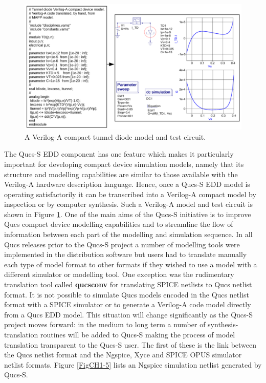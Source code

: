 \documentclass[10pt, a4paper]{report}
\begin{document}
\begin{figure}[h]
	\centering
	\includegraphics*[width=13cm]{pics/chap1/Qucs-S-CH1-Fig4.pdf}
	\caption{A Verilog-A compact tunnel diode model and test circuit. }
	\label{FigCH1-4}
\end{figure}
\noindent The Qucs-S EDD component has one feature which makes it particularly important for developing compact device simulation  models, namely that its structure and modelling capabilities are similar to those available with the Verilog-A hardware description language.  Hence, once a Qucs-S EDD model is operating satisfactorily it can be transcribed into a Verilog-A compact model by inspection or by computer synthesis.  Such a Verilog-A model and test circuit is shown in Figure \ref{FigCH1-4}.
One of the main aims of the Qucs-S initiative is to improve Qucs compact device modelling capabilities and to streamline the flow of information between each part of the modelling and simulation sequence. In all Qucs releases prior to the Qucs-S project a number of modelling tools were implemented in the distribution software but users had to translate manually each type of model format to other formats if they wished to use a model with a different simulator or modelling tool. One exception was the rudimentary translation tool called \textbf{qucsconv} for translating SPICE netlists to Qucs netlist format. It is not possible to simulate Qucs models encoded in the Qucs netlist format with a SPICE simulator or to generate a Verilog-A code model directly from a Qucs EDD model. This situation will change significantly as the Qucs-S project moves forward: in the medium to long term a number of synthesis-translation routines will be added to Qucs-S making the process of model translation transparent to the Qucs-S user.  The first of these is the link between the Qucs netlist format and the Ngspice, Xyce and SPICE OPUS simulator netlist formats. Figure \ref{FigCH1-5} lists an Ngspice simulation netlist generated by Qucs-S. 
\end{document}
